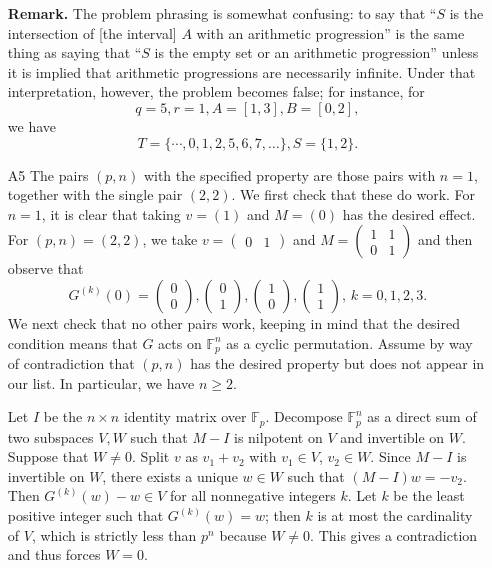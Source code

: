 \documentclass[amssymb,twocolumn,pra,10pt,aps]{revtex4-1}
\newcommand{\FF}{\mathbb{F}}
\begin{document}
\begin{itemize}
\noindent
\textbf{Remark.} The problem phrasing is somewhat confusing: to say that ``$S$ is the intersection of
[the interval] $A$ with an arithmetic progression'' is the same thing as saying that ``$S$ is the empty set or an arithmetic progression'' unless it is implied that arithmetic progressions are necessarily infinite.
Under that interpretation, however, the problem becomes false; for instance, for
\[
q=5, r=1, A = [1,3], B = [0,2],
\]
we have
\[
T = \{\cdots, 0,1,2,5,6,7,\dots\}, S = \{1,2\}.
\]

\item[A5]
The pairs $(p,n)$ with the specified property are those pairs with $n=1$, together with the single pair
$(2,2)$. We first check that these do work. For $n=1$, it is clear that taking $v = (1)$ and $M = (0)$
has the desired effect. For $(p,n) = (2,2)$, we take $v = \begin{pmatrix} 0 & 1 \end{pmatrix}$
and $M = \begin{pmatrix} 1 & 1 \\ 0 & 1 \end{pmatrix}$ and then observe that
\[
G^{(k)}(0) = \begin{pmatrix} 0 \\ 0 \end{pmatrix},
\begin{pmatrix} 0 \\ 1 \end{pmatrix},
\begin{pmatrix} 1 \\ 0 \end{pmatrix},
\begin{pmatrix} 1 \\ 1 \end{pmatrix}, \,
k=0,1,2,3.
\]
We next check that no other pairs work, keeping in mind that the desired condition means that
$G$ acts on $\FF_p^n$ as a cyclic permutation. Assume by way of contradiction that $(p,n)$ has the desired
property but does not appear in our list. In particular, we have $n \geq 2$.

Let $I$ be the $n \times n$ identity matrix over $\FF_p$.
Decompose $\FF_p^n$ as a direct sum of two subspaces $V,W$ such that
$M-I$ is nilpotent on $V$ and invertible on $W$. Suppose that $W \neq 0$.
Split $v$ as $v_1 + v_2$ with $v_1 \in V$, $v_2 \in W$. Since $M-I$ is invertible on $W$, there exists a
unique $w \in W$ such that $(M-I)w = -v_2$. Then $G^{(k)}(w) - w \in V$ for all nonnegative integers $k$.
Let $k$ be the least positive integer such that $G^{(k)}(w) = w$; then $k$ is at most the cardinality of $V$,
which is strictly less than $p^n$ because $W \neq 0$. This gives a contradiction and thus forces $W = 0$.


\end{itemize}
\end{document}
